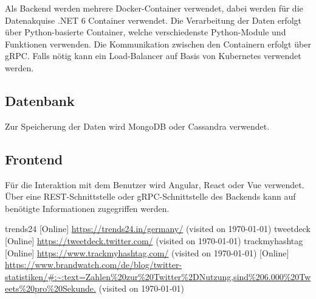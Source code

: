 \documentclass[conference]{IEEEtran}
\begin{document}
Als Backend werden mehrere Docker-Container verwendet, dabei werden für die Datenakquise .NET 6 Container verwendet. Die Verarbeitung der Daten erfolgt über Python-basierte Container, welche verschiedenste Python-Module und Funktionen verwenden.
Die Kommunikation zwischen den Containern erfolgt über gRPC.
Falls nötig kann ein Load-Balancer auf Basis von Kubernetes verwendet werden.

\subsection*{Datenbank}
Zur Speicherung der Daten wird MongoDB oder Cassandra verwendet.

\subsection*{Frontend}

Für die Interaktion mit dem Benutzer wird Angular, React oder Vue verwendet.
Über eine REST-Schnittstelle oder gRPC-Schnittstelle des Backends kann auf benötigte Informationen zugegriffen werden.


\begin{thebibliography}{0}
        trends24 [Online] \url{https://trends24.in/germany/} (visited on \today)
        tweetdeck [Online] \url{https://tweetdeck.twitter.com/} (visited on \today)
        trackmyhashtag [Online] \url{https://www.trackmyhashtag.com/} (visited on \today)
         [Online] \url{https://www.brandwatch.com/de/blog/twitter-statistiken/#:~:text=Zahlen%20zur%20Twitter%2DNutzung,sind%206.000%20Tweets%20pro%20Sekunde.} (visited on \today)
\end{thebibliography}
\vspace{12pt}
\end{document}
